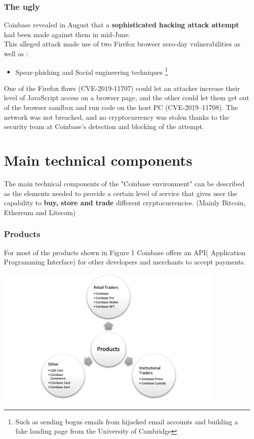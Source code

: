 \documentclass[12pt,a4paper]{article}
\begin{document}
  \subsubsection{The ugly}
 \begin{justify}
Coinbase revealed in August that a \textbf{sophisticated hacking attack attempt} had been made against them in mid-June. \\
This alleged attack made use of two Firefox browser zero-day vulnerabilities as well as :
\begin{itemize}
    \item Spear-phishing and Social engineering techniques
    \footnote{Such as sending bogus emails from hijacked email accounts and building a fake landing page from the University of Cambridge}
        
    
\end{itemize}
One of the Firefox flaws (CVE-2019-11707) could let an attacker increase their level of  JavaScript access on a browser page, and the other could let them get out of the browser sandbox and run code on the host PC (CVE-2019–11708). The network was not breached, and no cryptocurrency was stolen thanks to the security team at Coinbase's detection and blocking of the attempt.
 \end{justify}
\section{Main technical components}
The main technical components of the "Coinbase environment" can be described as the elements needed to provide a certain level of service that gives user the capability to \textbf{buy, store and trade} different cryptocurrencies. (Mainly Bitcoin, Ethereum and Litecoin)
\subsubsection{Products}
\begin{justify}
For most of the products shown in Figure 1 Coinbase offers an \textbf{}API( Application Programming Interface) for other developers and merchants to accept payments.
\end{justify}
\begin{center}
    \includegraphics[width=0.85\textwidth]{figures/Picture 1.png}    
\end{center}
\end{document}
